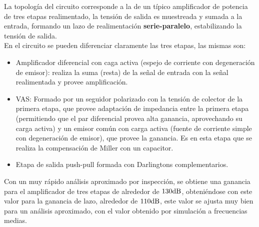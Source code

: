 
\normalfont

La topología del circuito corresponde a la de un típico amplificador de potencia de tres etapas realimentado, la tensión de salida es muestreada y sumada a la entrada, formando un lazo de realimentación \textbf{serie-paralelo}, estabilizando la tensión de salida. \\

En el circuito se pueden diferenciar claramente las tres etapas, las mismas son:


\begin{itemize}
\item Amplificador diferencial con caga activa (espejo de corriente con degeneración de emisor): realiza la suma (resta) de la señal de entrada con la señal realimentada y provee amplificación.
\item VAS: Formado por un seguidor polarizado con la tensión de colector de la primera etapa, que provee adaptación de impedancia entre la primera etapa (permitiendo que el par diferencial provea alta ganancia, aprovechando su carga activa) y un emisor común con carga activa (fuente de corriente simple con degeneración de emisor), que provee la ganancia. Es en esta etapa que se realiza la compensación de Miller con un capacitor.
\item Etapa de salida push-pull formada con Darlingtons complementarios.
\end{itemize}

Con un muy rápido análisis aproximado por inspección, se obtiene una ganancia para el amplificador de tres etapas de alrededor de $130 \si[per-mode=symbol]{\decibel}$, obteniéndose con este valor para la ganancia de lazo, alrededor de $110 \si[per-mode=symbol]{\decibel}$, este valor se ajusta muy bien para un análisis aproximado, con el valor obtenido por simulación a frecuencias medias.






